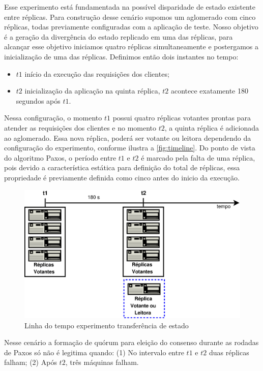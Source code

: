 Esse experimento está fundamentada na possível disparidade de estado existente entre
réplicas. Para construção desse cenário supomos um aglomerado com cinco réplicas, todas
previamente configuradas com a aplicação de teste. Nosso objetivo é a geração da
divergência do estado replicado em uma das réplicas, para alcançar esse objetivo iniciamos
quatro réplicas simultaneamente e postergamos a inicialização de uma das réplicas.
Definimos então dois instantes no tempo:

\begin{itemize}
  \item $t1$ início da execução das requisições dos clientes;
  \item $t2$ inicialização da aplicação na quinta réplica, $t2$ acontece exatamente 180
    segundos após $t1$.
\end{itemize}

Nessa configuração, o momento $t1$ possui quatro réplicas votantes prontas para atender as
requisições dos clientes e no momento $t2$, a quinta réplica é adicionada ao aglomerado.
Essa nova réplica, poderá ser votante ou leitora dependendo da configuração do
experimento, conforme ilustra a \autoref{fig:timeline}. Do ponto de vista do algoritmo
Paxos, o período entre $t1$ e $t2$ é marcado pela falta de uma réplica, pois devido a
característica estática para definição do total de réplicas, essa propriedade é
previamente definida como cinco antes do inicio da execução.

\begin{figure}[ht]
  \centering
  \includegraphics[width=12cm]{conteudo/capitulos/figuras/timeline.eps}
  \caption{Linha do tempo experimento transferência de estado}
  \label{fig:timeline}
\end{figure}

Nesse cenário a formação de quórum para eleição do consenso durante as rodadas de Paxos só
não é legitima quando: (1) No intervalo entre $t1$ e $t2$ duas réplicas falham; (2) Após
$t2$, três máquinas falham.

